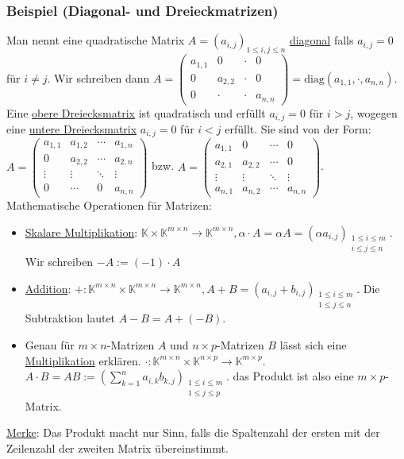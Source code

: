 \subsubsection{Beispiel (Diagonal- und Dreieckmatrizen)}
Man nennt eine quadratische Matrix $A=(a_{i,j})_{1\leq i,j\leq n}$ \underline{diagonal} falls $a_{i,j}=0$ für $i\not=j$.  Wir schreiben dann $A=\left(\begin{array}{cccc}a_{1,1} & 0 & \cdot & 0\\ 0 & a_{2,2} &\cdot & 0\\ 0 &\cdot &\cdot & a_{n,n}\end{array}\right)=\text{diag}(a_{1,1},\cdot,a_{n,n})$.  Eine \underline{obere Dreiecksmatrix} ist quadratisch und erfüllt $a_{i,j}=0$ für $i>j$, wogegen eine \underline{untere Dreiecksmatrix} $a_{i,j}=0$ für $i<j$ erfüllt.  Sie sind von der Form: $A=\left(\begin{array}{cccc}a_{1,1} & a_{1,2} & \cdots & a_{1,n}\\ 0 & a_{2,2} & \cdots & a_{2,n}\\ \vdots & \vdots & \ddots &\vdots \\ 0 & \cdots & 0 & a_{n,n}\end{array}\right)$ bzw. $A=\left(\begin{array}{cccc}a_{1,1} & 0 & \cdots & 0\\a_{2,1} & a_{2,2} & \cdots & 0 \\ \vdots & \vdots & \ddots &\vdots \\ a_{n,1} & a_{n,2}  &\cdots & a_{n,n}\end{array}\right)$.\\
Mathematische Operationen für Matrizen:
\begin{itemize}
\item \underline{Skalare Multiplikation}: $\mathbb{K}\times \mathbb{K}^{m\times n} \rightarrow \mathbb{K}^{m\times n}, \alpha \cdot A= \alpha A=(\alpha a_{i,j})_{\substack{1\leq i\leq m \\ i\leq j\leq n}}$.  Wir schreiben $-A:=(-1)\cdot A$
\item \underline{Addition}: $+:\mathbb{K}^{m\times n}\times \mathbb{K}^{m\times n} \rightarrow \mathbb{K}^{m\times n},A+B=(a_{i,j}+b_{i,j})_{\substack{1\leq i\leq m \\ 1\leq j\leq n}}$.  Die Subtraktion lautet $A-B=A+(-B)$.
\item Genau für $m\times n$-Matrizen $A$ und $n\times p$-Matrizen $B$ lässt sich eine \underline{Multiplikation} erklären.  $\cdot : \mathbb{K}^{m\times n}\times \mathbb{K}^{n\times p}\rightarrow \mathbb{K}^{m\times p}$.  $A\cdot B=AB:=(\sum^n_{k=1} a_{i,k}b_{k,j})_{\substack{1\leq i\leq m\\1\leq j\leq p}}$. das Produkt ist also eine $m\times p$-Matrix.
\end{itemize}
\underline{Merke}: Das Produkt macht nur Sinn, falls die Spaltenzahl der ersten mit der Zeilenzahl der zweiten Matrix übereinstimmt.
